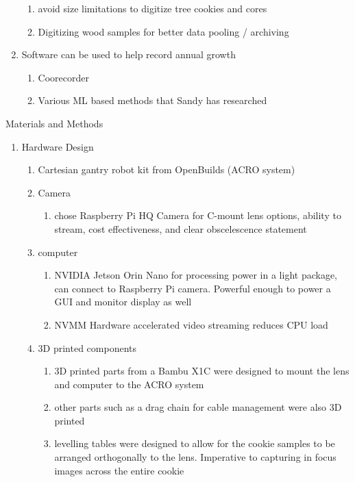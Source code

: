 \documentclass{article}
\begin{document}
\begin{outline}[enumerate]
\begin{enumerate}
\begin{enumerate}
		\item avoid size limitations to digitize tree cookies and cores 
		\item Digitizing wood samples for better data pooling / archiving
		\end{enumerate}
	\item Software can be used to help record annual growth 
		\begin{enumerate}
		\item Coorecorder
		\item Various ML based methods that Sandy has researched
		\end{enumerate}
	\end{enumerate}
\item Materials and Methods
		\begin{enumerate}
		\item Hardware Design
			\begin{enumerate}
			\item Cartesian gantry robot kit from OpenBuilds (ACRO system)
			\item Camera 
				\begin{enumerate}
				\item chose Raspberry Pi HQ Camera for C-mount lens options, ability to stream, cost effectiveness, and clear obscelescence statement
				\end{enumerate}
			\item computer
				\begin{enumerate}
				\item NVIDIA Jetson Orin Nano for processing power in a light package, can connect to Raspberry Pi camera. Powerful enough to power a GUI and monitor display as well
				\item NVMM Hardware accelerated video streaming reduces CPU load 
				\end{enumerate}
			\item 3D printed components
				\begin{enumerate}
				\item 3D printed parts from a Bambu X1C were designed to mount the lens and computer to the ACRO system
				\item other parts such as a drag chain for cable management were also 3D printed
				\item levelling tables were designed to allow for the cookie samples to be arranged orthogonally to the lens. Imperative to capturing in focus images across the entire cookie
				\end{enumerate}

\end{enumerate}
\end{enumerate}
\end{outline}
\end{document}
